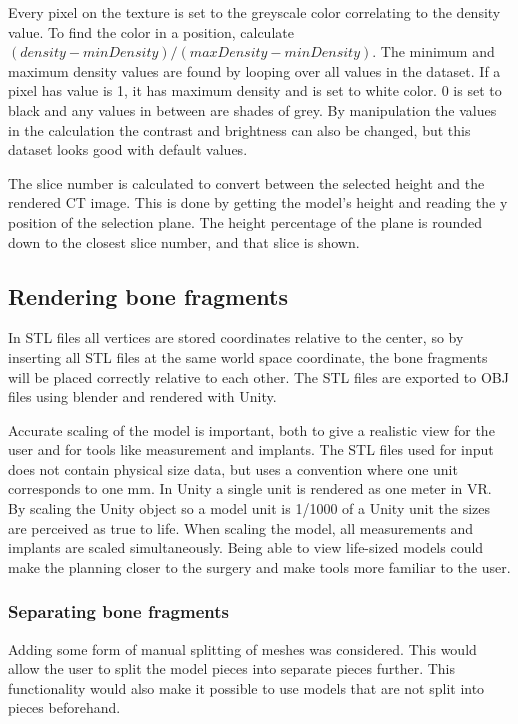 \documentclass[a4paper]{report}
\begin{document}
Every pixel on the texture is set to the greyscale color correlating to the density value. To find the color in a position, calculate $(density-minDensity)/(maxDensity-minDensity)$. The minimum and maximum density values are found by looping over all values in the dataset.
If a pixel has value is 1, it has maximum density and is set to white color. 0 is set to black and any values in between are shades of grey.
By manipulation the values in the calculation the contrast and brightness can also be changed, but this dataset looks good with default values.


The slice number is calculated to convert between the selected height and the rendered CT image. This is done by getting the model's height and reading the y position of the selection plane. The height percentage of the plane is rounded down to the closest slice number, and that slice is shown.

\subsection{Rendering bone fragments}
In STL files all vertices are stored coordinates relative to the center, so by inserting all STL files at the same world space coordinate, the bone fragments will be placed correctly relative to each other. The STL files are exported to OBJ files using blender and rendered with Unity.

Accurate scaling of the model is important, both to give a realistic view for the user and for tools like measurement and implants. The STL files used for input does not contain physical size data, but uses a convention where one unit corresponds to one mm. In Unity a single unit is rendered as one meter in VR. By scaling the Unity object so a model unit is 1/1000 of a Unity unit the sizes are perceived as true to life. When scaling the model, all measurements and implants are scaled simultaneously.
Being able to view life-sized models could make the planning closer to the surgery and make tools more familiar to the user.

\subsubsection{Separating bone fragments}
Adding some form of manual splitting of meshes was considered. This would allow the user to split the model pieces into separate pieces further. This functionality would also make it possible to use models that are not split into pieces beforehand.
\end{document}
